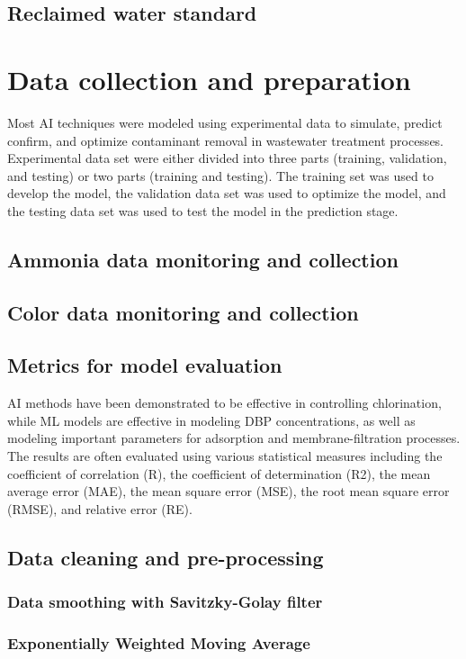 \subsection{Reclaimed water standard }
\section{Data collection and preparation}
Most AI techniques were modeled using experimental data to simulate, predict confirm, and optimize contaminant removal in wastewater treatment processes. Experimental data set were either divided into three parts (training, validation, and testing) or two parts (training and testing). The training set was used to develop the model, the validation data set was used to optimize the model, and the testing data set was used to test the model in the prediction stage.
\subsection{Ammonia data monitoring and collection}
\subsection{Color data monitoring and collection}
\subsection{Metrics for model evaluation}
AI methods have been demonstrated to be effective in controlling chlorination, while ML models are effective in modeling DBP concentrations, as well as modeling important parameters for adsorption and membrane-filtration processes. The results are often evaluated using various statistical measures including the coefficient of correlation (R), the coefficient of determination (R2), the mean average error (MAE), the mean square error (MSE), the root mean square error (RMSE), and relative error (RE).
\subsection{Data cleaning and pre-processing}
\subsubsection{Data smoothing with Savitzky-Golay filter}
\subsubsection{Exponentially Weighted Moving Average}
